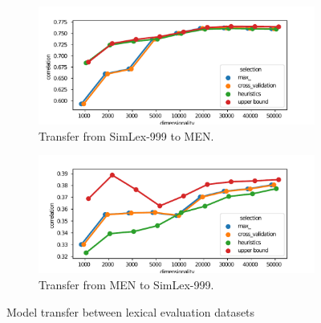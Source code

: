 \begin{figure}
  \centering

  \begin{subfigure}[t]{0.49\textwidth}
    \includegraphics[width=\textwidth]{supplement/figures/SimLex999-transfer}
    \caption{Transfer from SimLex-999 to MEN.}
    \label{fig:SimLex999-transfer}
  \end{subfigure}
  \begin{subfigure}[t]{0.49\textwidth}
    \includegraphics[width=\textwidth]{supplement/figures/men-transfer}
    \caption{Transfer from MEN to SimLex-999.}
    \label{fig:men-transfer}
  \end{subfigure}

  \caption{Model transfer between lexical evaluation datasets}
  \label{fig:lexical-transfer}
\end{figure}

